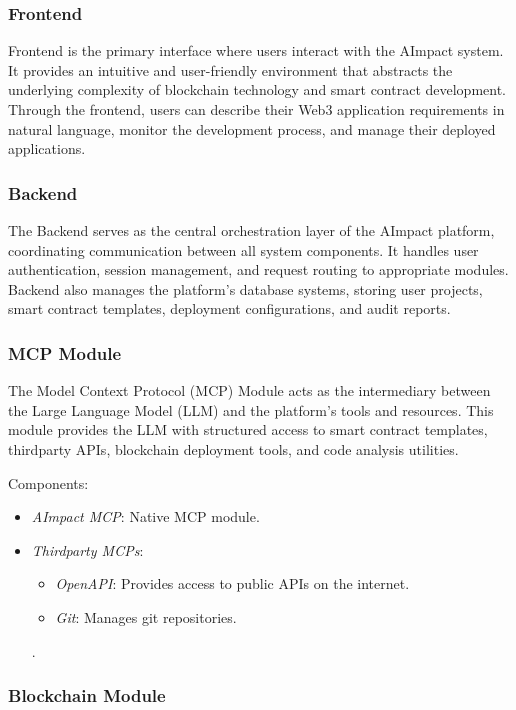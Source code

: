 \documentclass[12pt,a4paper]{article}
\begin{document}
\subsubsection{Frontend}

Frontend is the primary interface where users interact with the AImpact system. 
It provides an intuitive and user-friendly environment that abstracts the underlying complexity of blockchain technology and smart contract development. 
Through the frontend, users can describe their Web3 application requirements in natural language, monitor the development process, 
and manage their deployed applications.


\subsubsection{Backend}

The Backend serves as the central orchestration layer of the AImpact platform, coordinating communication between all system components. 
It handles user authentication, session management, and request routing to appropriate modules. 
Backend also manages the platform's database systems, storing user projects, smart contract templates, deployment configurations, and audit reports.


\subsubsection{MCP Module}

The Model Context Protocol (MCP) Module acts as the intermediary between the Large Language Model (LLM) and the platform's tools and resources. 
This module provides the LLM with structured access to smart contract templates, thirdparty APIs, blockchain deployment tools, and code analysis utilities. 

Components:
\begin{itemize}
    \item \textit{AImpact MCP}: Native MCP module.
    \item \textit{Thirdparty MCPs}:
        \begin{itemize}
            \item \textit{OpenAPI}: Provides access to public APIs on the internet.
            \item \textit{Git}: Manages git repositories.
        \end{itemize}
    .

\end{itemize}
\subsubsection{Blockchain Module}
\end{document}
